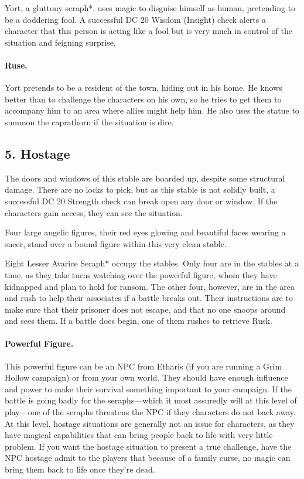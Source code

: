 \documentclass[10pt,a4paper,twoside,twocolumn,openany,bg=print,nodeprecatedcode]{dndbook}
\begin{document}
Yort, a gluttony seraph*, uses magic to disguise himself as human, pretending to be a doddering fool. A successful DC 20 Wisdom (Insight) check alerts a character that this person is acting like a fool but is very much in control of the situation and feigning surprise.
\paragraph{Ruse.}
Yort pretends to be a resident of the town, hiding out in his home. He knows better than to challenge the characters on his own, so he tries to get them to accompany him to an area where allies might help him. He also uses the statue to summon the caprathorn if the situation is dire.
\subsection{5. Hostage}
The doors and windows of this stable are boarded up, despite some structural damage. There are no locks to pick, but as this stable is not solidly built, a successful DC 20 Strength check can break open any door or window. If the characters gain access, they can see the situation.
\begin{DndReadAloud}{}
Four large angelic figures, their red eyes glowing and beautiful faces wearing a sneer, stand over a bound figure within this very clean stable.
\end{DndReadAloud}

Eight Lesser Avarice Seraph* occupy the stables. Only four are in the stables at a time, as they take turns watching over the powerful figure, whom they have kidnapped and plan to hold for ransom. The other four, however, are in the area and rush to help their associates if a battle breaks out. Their instructions are to make sure that their prisoner does not escape, and that no one snoops around and sees them. If a battle does begin, one of them rushes to retrieve Rusk.
\paragraph{Powerful Figure.}
This powerful figure can be an NPC from Etharis (if you are running a Grim Hollow campaign) or from your own world. They should have enough influence and power to make their survival something important to your campaign.
If the battle is going badly for the seraphs—which it most assuredly will at this level of play—one of the seraphs threatens the NPC if they characters do not back away. At this level, hostage situations are generally not an issue for characters, as they have magical capabilities that can bring people back to life with very little problem. If you want the hostage situation to present a true challenge, have the NPC hostage admit to the players that because of a family curse, no magic can bring them back to life once they're dead.
\end{document}
